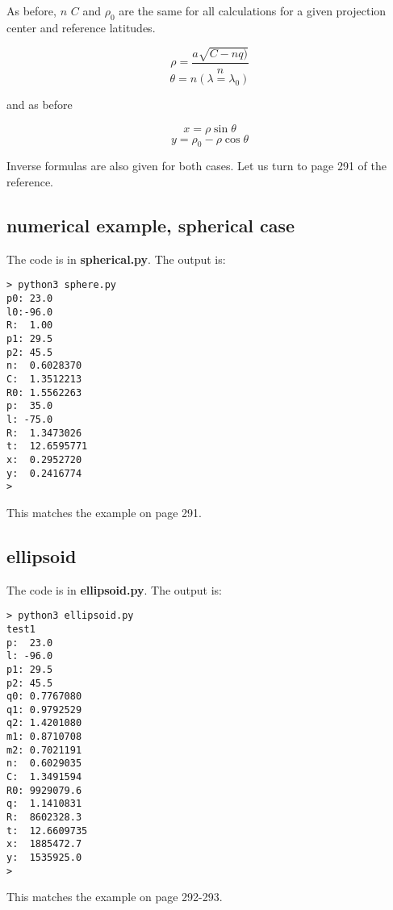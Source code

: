 \documentclass[11pt, oneside]{article}
\begin{document}
As before, $n$ $C$ and $\rho_0$ are the same for all calculations for a given projection center and reference latitudes.

\[ \rho = \frac{a \sqrt{C - nq)} }{n} \]
\[ \theta = n (\lambda = \lambda_0) \]

and as before

\[ x = \rho \sin \theta \]
\[ y = \rho_0 - \rho \cos \theta \]

Inverse formulas are also given for both cases.  Let us turn to page 291 of the reference.

\subsection*{numerical example, spherical case}

The code is in \textbf{spherical.py}.  The output is:

\begin{verbatim}
> python3 sphere.py  
p0: 23.0
l0:-96.0
R:  1.00
p1: 29.5
p2: 45.5
n:  0.6028370
C:  1.3512213
R0: 1.5562263
p:  35.0
l: -75.0
R:  1.3473026
t:  12.6595771
x:  0.2952720
y:  0.2416774
>
\end{verbatim}

This matches the example on page 291.

\subsection*{ellipsoid}

The code is in \textbf{ellipsoid.py}.  The output is:

\begin{verbatim}
> python3 ellipsoid.py
test1
p:  23.0
l: -96.0
p1: 29.5
p2: 45.5
q0: 0.7767080
q1: 0.9792529
q2: 1.4201080
m1: 0.8710708
m2: 0.7021191
n:  0.6029035
C:  1.3491594
R0: 9929079.6
q:  1.1410831
R:  8602328.3
t:  12.6609735
x:  1885472.7
y:  1535925.0
>
\end{verbatim}

This matches the example on page 292-293.
\end{document}
